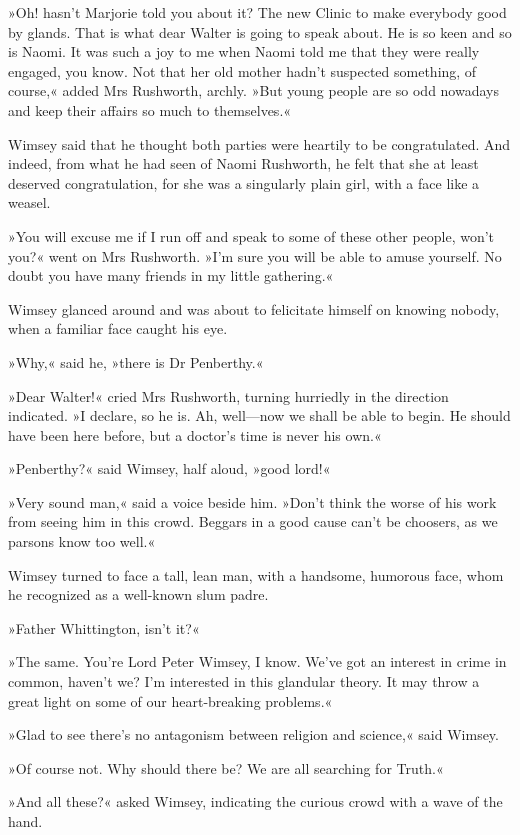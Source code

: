»Oh! hasn't Marjorie told you about it? The new Clinic to make everybody good by glands. That is what dear Walter is going to speak about. He is so keen and so is Naomi. It was such a joy to me when Naomi told me that they were really engaged, you know. Not that her old mother hadn't suspected something, of course,« added Mrs Rushworth, archly. »But young people are so odd nowadays and keep their affairs so much to themselves.«

Wimsey said that he thought both parties were heartily to be congratulated. And indeed, from what he had seen of Naomi Rushworth, he felt that she at least deserved congratulation, for she was a singularly plain girl, with a face like a weasel.

»You will excuse me if I run off and speak to some of these other people, won't you?« went on Mrs Rushworth. »I'm sure you will be able to amuse yourself. No doubt you have many friends in my little gathering.«

Wimsey glanced around and was about to felicitate himself on knowing nobody, when a familiar face caught his eye.

»Why,« said he, »there is Dr Penberthy.«

»Dear Walter!« cried Mrs Rushworth, turning hurriedly in the direction indicated. »I declare, so he is. Ah, well—now we shall be able to begin. He should have been here before, but a doctor's time is never his own.«

»Penberthy?« said Wimsey, half aloud, »good lord!«

»Very sound man,« said a voice beside him. »Don't think the worse of his work from seeing him in this crowd. Beggars in a good cause can't be choosers, as we parsons know too well.«

Wimsey turned to face a tall, lean man, with a handsome, humorous face, whom he recognized as a well-known slum padre.

»Father Whittington, isn't it?«

»The same. You're Lord Peter Wimsey, I know. We've got an interest in crime in common, haven't we? I'm interested in this glandular theory. It may throw a great light on some of our heart-breaking problems.«

»Glad to see there's no antagonism between religion and science,« said Wimsey.

»Of course not. Why should there be? We are all searching for Truth.«

»And all these?« asked Wimsey, indicating the curious crowd with a wave of the hand.

